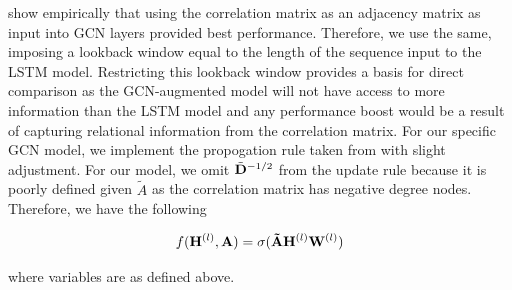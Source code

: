 \cite{Peng2021} show empirically that using the correlation matrix as an adjacency matrix as input into GCN layers provided best performance. Therefore, we use the same, imposing a lookback window equal to the length of the sequence input to the LSTM model. Restricting this lookback window provides a basis for direct comparison as the GCN-augmented model will not have access to more information than the LSTM model and any performance boost would be a result of capturing relational information from the correlation matrix. For our specific GCN model, we implement the propogation rule taken from \cite{Kipf2017} with slight adjustment. For our model, we omit $\tilde{\mVector{D}}^{-1/2}$ from the update rule because it is poorly defined given $\tilde{A}$ as the correlation matrix has negative degree nodes. Therefore, we have the following 

\begin{equation}
f(\mVector{H}^{(l)}, \mVector{A}) = \sigma(\mVector{\tilde{A}}\mVector{H}^{(l)}\mVector{W}^{(l)})
\end{equation}

where variables are as defined above.